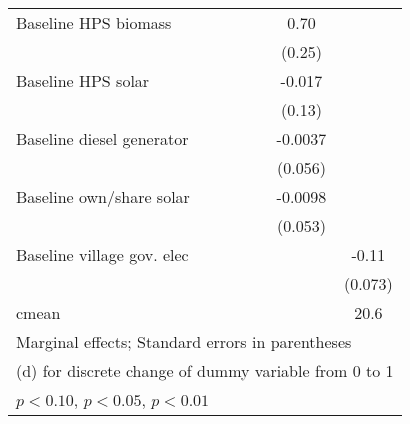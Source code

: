 \begin{table}[htbp]
\begin{tabular*}{1\hsize}{@{\hskip\tabcolsep\extracolsep\fill}l*{6}{c}}
Baseline HPS biomass&                  &                  &                  &                  &     0.70\sym{***}&                  \\
                &                  &                  &                  &                  &   (0.25)         &                  \\
Baseline HPS solar&                  &                  &                  &                  &   -0.017         &                  \\
                &                  &                  &                  &                  &   (0.13)         &                  \\
Baseline diesel generator&                  &                  &                  &                  &  -0.0037         &                  \\
                &                  &                  &                  &                  &  (0.056)         &                  \\
Baseline own/share solar&                  &                  &                  &                  &  -0.0098         &                  \\
                &                  &                  &                  &                  &  (0.053)         &                  \\
Baseline village gov. elec&                  &                  &                  &                  &                  &    -0.11         \\
                &                  &                  &                  &                  &                  &  (0.073)         \\
\midrule
cmean           &                  &                  &                  &                  &                  &     20.6         \\
\bottomrule
\multicolumn{7}{l}{\footnotesize Marginal effects; Standard errors in parentheses}\\
\multicolumn{7}{l}{\footnotesize  (d) for discrete change of dummy variable from 0 to 1}\\
\multicolumn{7}{l}{\footnotesize \sym{*} \(p<0.10\), \sym{**} \(p<0.05\), \sym{***} \(p<0.01\)}\\
\end{tabular*}
\end{table}

